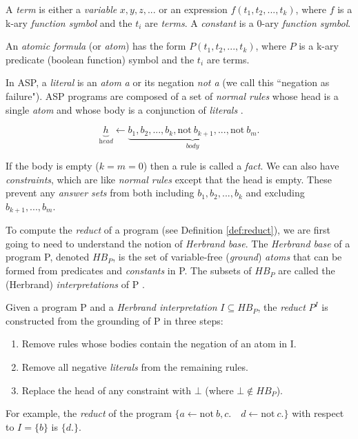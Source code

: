 \begin{definition}
A \textit{term} is either a \textit{variable} $x,y,z,...$ or an expression $f(t_1,t_2,...,t_k)$, where $f$ is a k-ary \textit{function symbol} and the $t_i$ are \textit{terms}. A \textit{constant} is a 0-ary \textit{function symbol}.
\end{definition}

\begin{definition}
An \textit{atomic formula} (or \textit{atom}) has the form $P(t_1,t_2,...,t_k)$, where $P$ is a k-ary predicate (boolean function) symbol and the $t_i$ are terms.
\end{definition}

\noindent
In ASP, a \textit{literal} is an \textit{atom} \textit{a} or its negation \textit{not a} (we call this ``negation as failure"). ASP programs are composed of a set of \textit{normal rules} whose head is a single \textit{atom} and whose body is a conjunction of \textit{literals} \cite{law_representing_2019}.

\begin{equation}
\underbrace{h}_{\textit{head}} \leftarrow \underbrace{b_1, b_2, ..., b_k, \text{not}\ b_{k+1}, ..., \text{not}\ b_m}_{\textit{body}}.
\end{equation}

\noindent
If the body is empty ($k = m = 0$) then a rule is called a \textit{fact}. We can also have \textit{constraints}, which are like \textit{normal rules} except that the head is empty. These prevent any \textit{answer sets} from both including $b_1, b_2, ..., b_k$ and excluding $b_{k+1}, ..., b_m$.

To compute the \textit{reduct} of a program (see Definition \ref{def:reduct}), we are first going to need to understand the notion of \textit{Herbrand base}. The \textit{Herbrand base} of a program P, denoted $HB_P$, is the set of variable-free (\textit{ground}) \textit{atoms} that can be formed from predicates and \textit{constants} in P. The subsets of $HB_P$ are called the (Herbrand) \textit{interpretations} of P \cite{law_representing_2019}.

\begin{definition}
\label{def:reduct}
Given a program P and a \textit{Herbrand interpretation} $I \subseteq HB_P$, the \textit{reduct} $P^I$ is constructed from the grounding of P in three steps:
\begin{enumerate}[nolistsep]
\item Remove rules whose bodies contain the negation of an atom in I.
\item Remove all negative \textit{literals} from the remaining rules.
\item Replace the head of any constraint with $\bot$ (where $\bot \notin HB_P$).
\end{enumerate}
For example, the \textit{reduct} of the program $\{a \leftarrow \text{not}\ b, c.\quad d \leftarrow \text{not}\ c.\}$ with respect to $I=\{b\}$ is $\{d.\}$.
\end{definition}

